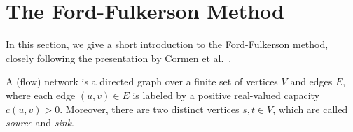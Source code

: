 \documentclass[smallcondensed]{svjour3}     %
\begin{document}
\section{The Ford-Fulkerson Method}\label{sec:background}
%       
%   
% 
%         
%   
%   
%   
%   
%   

In this section, we give a short introduction to the Ford-Fulkerson method, closely following the presentation by Cormen et al.~\cite{CLRS09}.

% 

A (flow) network is a directed graph over a finite set of vertices $V$ and edges $E$, where each edge $(u,v)\in E$ is labeled by a positive real-valued capacity $c(u,v)>0$.
Moreover, there are two distinct vertices $s,t\in V$, which are called \emph{source} and \emph{sink}. 
\end{document}
